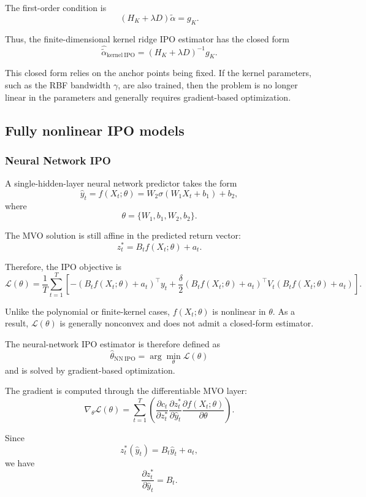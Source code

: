 \documentclass{article}
\begin{document}
The first-order condition is
\[
(H_K+\lambda D)\widetilde\alpha = g_K.
\]

Thus, the finite-dimensional kernel ridge IPO estimator has the closed form
\[
\boxed{
\hat{\widetilde\alpha}_{\mathrm{kernel\ IPO}}
=
(H_K+\lambda D)^{-1}g_K.
}
\]

This closed form relies on the anchor points being fixed. If the kernel
parameters, such as the RBF bandwidth \(\gamma\), are also trained, then the
problem is no longer linear in the parameters and generally requires
gradient-based optimization.

\subsection{Fully nonlinear IPO models}

\subsubsection{Neural Network IPO}

A single-hidden-layer neural network predictor takes the form
\[
\hat y_t
=
f(X_t;\theta)
=
W_2 \sigma(W_1X_t + b_1) + b_2,
\]
where
\[
\theta = \{W_1,b_1,W_2,b_2\}.
\]

The MVO solution is still affine in the predicted return vector:
\[
z_t^*
=
B_t f(X_t;\theta) + a_t.
\]

Therefore, the IPO objective is
\[
\mathcal L(\theta)
=
\frac{1}{T}
\sum_{t=1}^T
\left[
-
\left(B_t f(X_t;\theta)+a_t\right)^\top y_t
+
\frac{\delta}{2}
\left(B_t f(X_t;\theta)+a_t\right)^\top
V_t
\left(B_t f(X_t;\theta)+a_t\right)
\right].
\]

Unlike the polynomial or finite-kernel cases, \(f(X_t;\theta)\) is nonlinear in
\(\theta\). As a result, \(\mathcal L(\theta)\) is generally nonconvex and does
not admit a closed-form estimator.

The neural-network IPO estimator is therefore defined as
\[
\boxed{
\hat\theta_{\mathrm{NN\ IPO}}
=
\arg\min_{\theta}
\mathcal L(\theta)
}
\]
and is solved by gradient-based optimization.

The gradient is computed through the differentiable MVO layer:
\[
\nabla_{\theta}\mathcal L(\theta)
=
\sum_{t=1}^T
\left(
\frac{\partial c_t}{\partial z_t^*}
\frac{\partial z_t^*}{\partial \hat y_t}
\frac{\partial f(X_t;\theta)}{\partial \theta}
\right).
\]

Since
\[
z_t^*(\hat y_t) = B_t\hat y_t + a_t,
\]
we have
\[
\frac{\partial z_t^*}{\partial \hat y_t} = B_t.
\]
\end{document}
